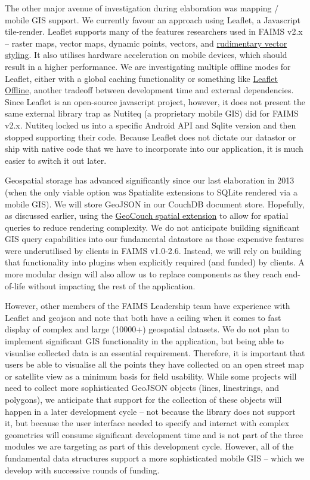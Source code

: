 \documentclass{faims3_report}
\begin{document}
The other major avenue of investigation during elaboration was mapping /
mobile GIS support. We currently favour an approach using Leaflet, a
Javascript tile-render. Leaflet supports many of the features
researchers used in FAIMS v2.x -- raster maps, vector maps, dynamic
points, vectors, and
\href{https://leafletjs.com/\#features}{{rudimentary vector styling}}.
It also utilises hardware acceleration on mobile devices, which should
result in a higher performance. We are investigating multiple offline
modes for Leaflet, either with a global caching functionality or
something like
\href{https://github.com/allartk/leaflet.offline}{{Leaflet Offline}},
another tradeoff between development time and external dependencies.
Since Leaflet is an open-source javascript project, however, it does not
present the same external library trap as Nutiteq (a proprietary mobile
GIS) did for FAIMS v2.x. Nutiteq locked us into a specific Android API
and Sqlite version and then stopped supporting their code. Because
Leaflet does not dictate our datastor or ship with native code that we
have to incorporate into our application, it is much easier to switch it
out later.

Geospatial storage has advanced significantly since our last elaboration
in 2013 (when the only viable option was Spatialite extensions to SQLite
rendered via a mobile GIS). We will store GeoJSON in our CouchDB
document store. Hopefully, as discussed earlier, using the
\href{https://github.com/couchbase/geocouch}{{GeoCouch spatial
extension}} to allow for spatial queries to reduce rendering complexity.
We do not anticipate building significant GIS query capabilities into
our fundamental datastore as those expensive features were underutilised
by clients in FAIMS v1.0-2.6. Instead, we will rely on building that
functionality into plugins when explicitly required (and funded) by
clients. A more modular design will also allow us to replace components
as they reach end-of-life without impacting the rest of the application.

However, other members of the FAIMS Leadership team have experience with
Leaflet and geojson and note that both have a ceiling when it comes to
fast display of complex and large (10000+) geospatial datasets. We do
not plan to implement significant GIS functionality in the application,
but being able to visualise collected data is an essential requirement.
Therefore, it is important that users be able to visualise all the
points they have collected on an open street map or satellite view as a
minimum basis for field usability. While some projects will need to
collect more sophisticated GeoJSON objects (lines, linestrings, and
polygons), we anticipate that support for the collection of these
objects will happen in a later development cycle -- not because the
library does not support it, but because the user interface needed to
specify and interact with complex geometries will consume significant
development time and is not part of the three modules we are targeting
as part of this development cycle. However, all of the fundamental data
structures support a more sophisticated mobile GIS -- which we develop
with successive rounds of funding.
\end{document}
